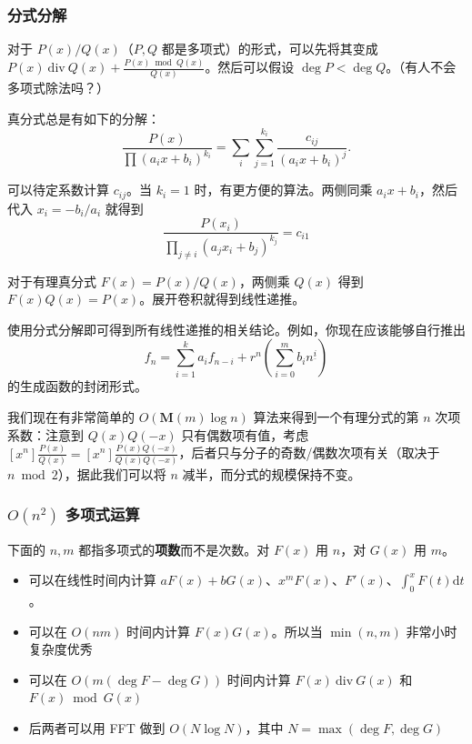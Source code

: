 \subsubsection{分式分解}
    对于 $P(x)/Q(x)$（$P,Q$ 都是多项式）的形式，可以先将其变成 $P(x)\ \mathrm{div}\ Q(x)+\frac{P(x)\bmod Q(x)}{Q(x)}$。然后可以假设 $\deg P<\deg Q$。（有人不会多项式除法吗？）

    真分式总是有如下的分解：
    $$
    \frac{P(x)}{\prod{(a_ix+b_i)^{k_i}}}=\sum_i\sum_{j=1}^{k_i}\frac{c_{ij}}{(a_ix+b_i)^{j}}.
    $$

    可以待定系数计算 $c_{ij}$。当 $k_i=1$ 时，有更方便的算法。两侧同乘 $a_ix+b_i$，然后代入 $x_i=-b_i/a_i$ 就得到
    $$
    \frac{P(x_i)}{\prod_{j\ne i}(a_jx_i+b_j)^{k_j}}=c_{i1}
    $$

    \begin{example}[线性递推]
        对于有理真分式 $F(x)=P(x)/Q(x)$，两侧乘 $Q(x)$ 得到 $F(x)Q(x)=P(x)$。展开卷积就得到线性递推。

    使用分式分解即可得到所有线性递推的相关结论。例如，你现在应该能够自行推出
    $$
    f_n=\sum_{i=1}^k a_if_{n-i}+r^n(\sum_{i=0}^m b_in^{\underline{i}})
    $$
    的生成函数的封闭形式。
    \end{example}
    \begin{remark}
            我们现在有非常简单的 $O(\mathbf{M}(m)\log n)$ 算法来得到一个有理分式的第 $n$ 次项系数：注意到 $Q(x)Q(-x)$ 只有偶数项有值，考虑 $[x^n]\frac{P(x)}{Q(x)}=[x^n]\frac{P(x)Q(-x)}{Q(x)Q(-x)}$，后者只与分子的奇数/偶数次项有关（取决于 $n\bmod 2$），据此我们可以将 $n$ 减半，而分式的规模保持不变。
    \end{remark}

\subsubsection{$O(n^2)$ 多项式运算}
    下面的 $n,m$ 都指多项式的\textbf{项数}而不是次数。对 $F(x)$ 用 $n$，对 $G(x)$ 用 $m$。 
    \begin{itemize}
        \item  可以在线性时间内计算 $aF(x)+bG(x)$、$x^mF(x)$、$F'(x)$、$\int_0^x F(t)\mathrm{d}t$。
        \item 可以在 $O(nm)$ 时间内计算 $F(x)G(x)$。所以当 $\min(n,m)$ 非常小时复杂度优秀
        \item 可以在 $O(m(\deg F-\deg G))$ 时间内计算 $F(x)\ \mathrm{div}\  G(x)$ 和 $F(x)\bmod G(x)$
        \item 后两者可以用 FFT 做到 $O(N\log N)$，其中 $N=\max(\deg F,\deg G)$
    \end{itemize}

